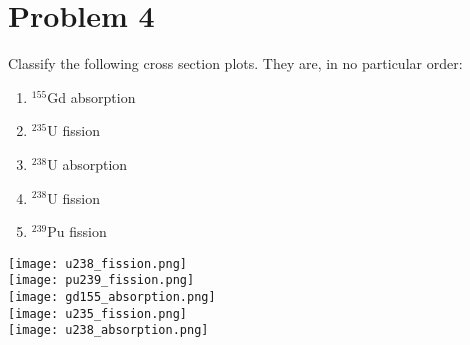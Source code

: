 \section*{Problem 4}

Classify the following cross section plots. They are, in no particular order:
\begin{enumerate}[(1)]
\item $^{155}$Gd absorption
\item $^{235}$U fission
\item $^{238}$U absorption
\item $^{238}$U fission
\item $^{239}$Pu fission
\end{enumerate}

\begin{center}
\texttt{[image: u238\_fission.png]}\\
\texttt{[image: pu239\_fission.png]}\\
\texttt{[image: gd155\_absorption.png]}\\
\texttt{[image: u235\_fission.png]}\\
\texttt{[image: u238\_absorption.png]}\\
\end{center}

